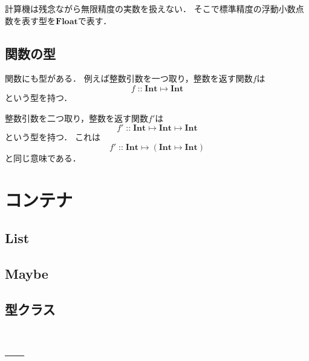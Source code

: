 \documentclass[twocolumn]{jsbook}
\newcommand{\typename}[1]{\mathbf{#1}}
\newcommand{\typeint}{\typename{Int}}
\newcommand{\typefloat}{\typename{Float}}
\newcommand{\morph}[2]{#1\mapsto#2}
\newcommand{\mmorph}[3]{#1\mapsto#2\mapsto#3}
\newcommand{\mmorphwithparenthesis}[3]{#1\mapsto(#2\mapsto#3)}
\newcommand{\guard}[1]{\mathop{\mid_{#1}}}
\newcommand{\istypeof}{\mathop{::}}
\begin{document}
計算機は残念ながら無限精度の実数を扱えない．
そこで標準精度の浮動小数点数を表す型を$\typefloat$で表す．

\section{関数の型}

関数にも型がある．
例えば整数引数を一つ取り，整数を返す関数$f$は$$f\istypeof\morph{\typeint}{\typeint}$$という型を持つ．

整数引数を二つ取り，整数を返す関数$f'$は$$f'\istypeof\mmorph{\typeint}{\typeint}{\typeint}$$という型を持つ．
これは$$f'\istypeof\mmorphwithparenthesis{\typeint}{\typeint}{\typeint}$$と同じ意味である．


\chapter{コンテナ}

\section{List}

\section{Maybe}

\section{型クラス}




\chapter{---}




\newcommand{\charlit}[1]{\texttt{#1}}

\newcommand{\applicativefunc}{\bigotimes} %
\newcommand{\bind}{\rightrightarrows} %
\newcommand{\comp}{\bullet} %
\newcommand{\concretetype}{\mathbf\ast} %
\newcommand{\defeq}{\xleftarrow{\text{def}}}
\newcommand{\dollar}{\mathop{\$}} %
\newcommand{\filterfunc}{\bigcap} %
\newcommand{\foldfunc}{\bigcup} %
\newcommand{\foldrightfunc}{\bigsqcup} %
\newcommand{\guard}[1]{\mathop{\mid_{{#1}}}}
\newcommand{\haskelllambda}{\backslash}
\newcommand{\lambdaperiod}{\;.\;}
\newcommand{\listappend}{\mathop{++}}
\newcommand{\mapfunc}{\bigodot} %
\newcommand{\monadfunc}{\bigoplus}
\newcommand{\monadjoin}{\dag}
\newcommand{\nullelem}{\emptyset}
\newcommand{\pure}{\bigstar} %
\newcommand{\typealpha}{\boldsymbol{\alpha}}
\newcommand{\unit}{\star} %
\end{document}
